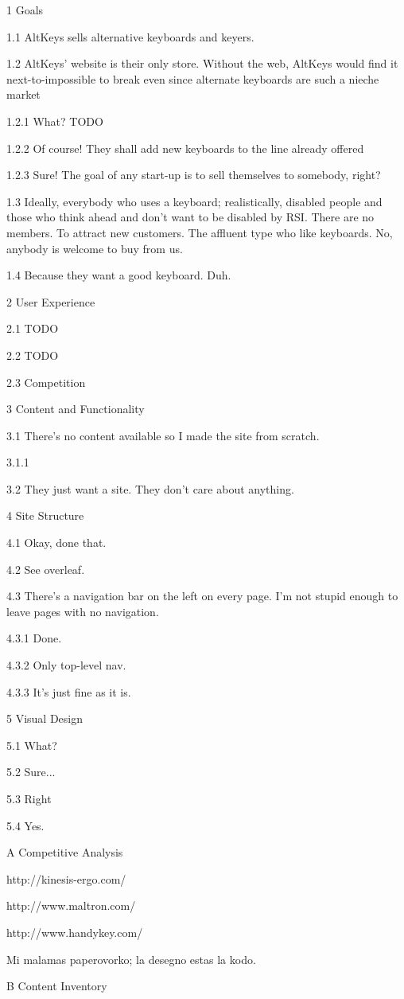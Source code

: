\documentclass[a4]{report}
\begin{document}
1 Goals

1.1 AltKeys sells alternative keyboards and keyers.

1.2 AltKeys' website is their only store. Without the web, AltKeys would find it next-to-impossible to break even since alternate keyboards are such a nieche market

1.2.1 What? TODO

1.2.2 Of course! They shall add new keyboards to the line already offered

1.2.3 Sure! The goal of any start-up is to sell themselves to somebody, right?

1.3 Ideally, everybody who uses a keyboard; realistically, disabled people and those who think ahead and don't want to be disabled by RSI. There are no members. To attract new customers. The affluent type who like keyboards. No, anybody is welcome to buy from us.

1.4 Because they want a good keyboard. Duh.

2 User Experience

2.1 TODO

2.2 TODO

2.3 Competition

3 Content and Functionality

3.1 There's no content available so I made the site from scratch.

3.1.1

3.2 They just want a site. They don't care about anything.

4 Site Structure

4.1 Okay, done that.

4.2 See overleaf.

4.3 There's a navigation bar on the left on every page. I'm not stupid enough to leave pages with no navigation.

4.3.1 Done.

4.3.2 Only top-level nav.

4.3.3 It's just fine as it is.

5 Visual Design

5.1 What?

5.2 Sure...

5.3 Right

5.4 Yes.

A Competitive Analysis

http://kinesis-ergo.com/

http://www.maltron.com/

http://www.handykey.com/

Mi malamas paperovorko; la desegno estas la kodo.

B Content Inventory
\end{document}
